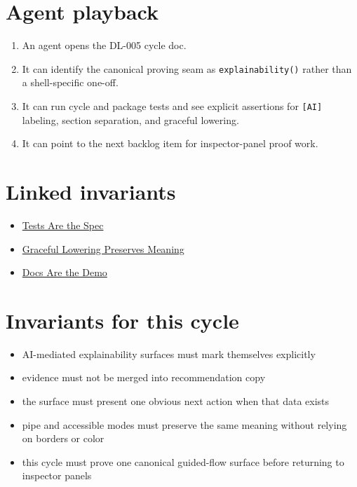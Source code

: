 \section{Agent playback}\label{record-172-agent-playback}

\begin{enumerate}
\def\labelenumi{\arabic{enumi}.}
\tightlist
\item
  An agent opens the DL-005 cycle doc.
\item
  It can identify the canonical proving seam as \texttt{e\allowbreak{}x\allowbreak{}p\allowbreak{}l\allowbreak{}a\allowbreak{}i\allowbreak{}n\allowbreak{}a\allowbreak{}b\allowbreak{}i\allowbreak{}l\allowbreak{}i\allowbreak{}t\allowbreak{}y\allowbreak{}(\allowbreak{})} rather than a shell-specific one-off.
\item
  It can run cycle and package tests and see explicit assertions for \texttt{[\allowbreak{}A\allowbreak{}I\allowbreak{}]} labeling, section separation, and graceful lowering.
\item
  It can point to the next backlog item for inspector-panel proof work.
\end{enumerate}

\section{Linked invariants}\label{record-172-linked-invariants}

\begin{itemize}
\tightlist
\item
  \href{https://github.com/flyingrobots/bijou/blob/cbd70612140e7a450d764b3c7be1c6af878b99bc/docs/invariants/tests-are-the-spec.md}{Tests Are the Spec}
\item
  \href{https://github.com/flyingrobots/bijou/blob/cbd70612140e7a450d764b3c7be1c6af878b99bc/docs/invariants/graceful-lowering-preserves-meaning.md}{Graceful Lowering Preserves Meaning}
\item
  \href{https://github.com/flyingrobots/bijou/blob/cbd70612140e7a450d764b3c7be1c6af878b99bc/docs/invariants/docs-are-the-demo.md}{Docs Are the Demo}
\end{itemize}

\section{Invariants for this cycle}\label{record-172-invariants-for-this-cycle}

\begin{itemize}
\tightlist
\item
  AI-mediated explainability surfaces must mark themselves explicitly
\item
  evidence must not be merged into recommendation copy
\item
  the surface must present one obvious next action when that data exists
\item
  pipe and accessible modes must preserve the same meaning without relying on borders or color
\item
  this cycle must prove one canonical guided-flow surface before returning to inspector panels
\end{itemize}

